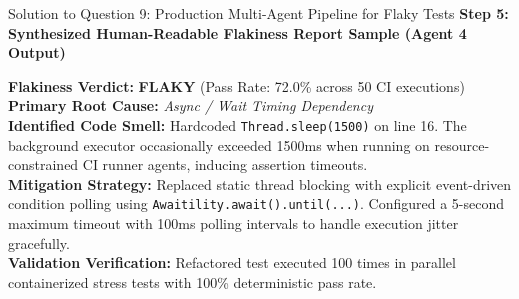 \documentclass[11pt,a4paper]{article}
\begin{document}
\begin{solutionbox}{Solution to Question 9: Production Multi-Agent Pipeline for Flaky Tests}
\medskip
\noindent
\textbf{Step 5: Synthesized Human-Readable Flakiness Report Sample (Agent 4 Output)}
\begin{tcolorbox}[colback=white, colframe=secondary, title={\textbf{Flakiness Remediation Report: \texttt{com.service.NotificationServiceTest}}}, fonttitle=\small\bfseries]
\small
\textbf{Flakiness Verdict:} \textcolor{accentred}{\textbf{FLAKY}} (Pass Rate: 72.0\% across 50 CI executions) \\
\textbf{Primary Root Cause:} \textit{Async / Wait Timing Dependency} \\
\textbf{Identified Code Smell:} Hardcoded \texttt{Thread.sleep(1500)} on line 16. The background executor occasionally exceeded 1500ms when running on resource-constrained CI runner agents, inducing assertion timeouts. \\
\textbf{Mitigation Strategy:} Replaced static thread blocking with explicit event-driven condition polling using \texttt{Awaitility.await().until(...)}. Configured a 5-second maximum timeout with 100ms polling intervals to handle execution jitter gracefully. \\
\textbf{Validation Verification:} Refactored test executed 100 times in parallel containerized stress tests with 100\% deterministic pass rate.
\end{tcolorbox}
\end{solutionbox}

\vspace{1.5em}
\end{document}
